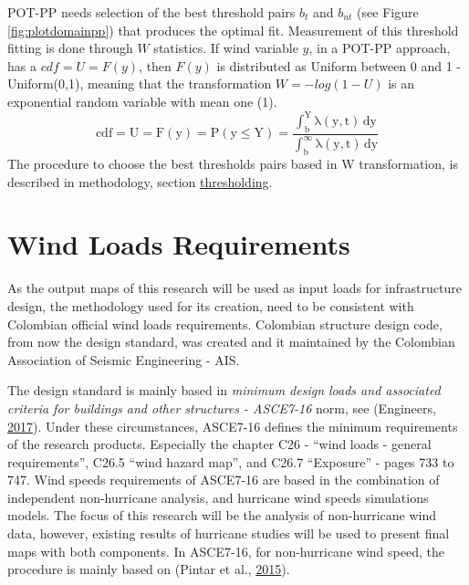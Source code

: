\documentclass[12pt,oneside]{reedthesis}
\begin{document}
POT-PP needs selection of the best threshold pairs \(b_t\) and \(b_{nt}\) (see Figure \ref{fig:plotdomainpp}) that produces the optimal fit. Measurement of this threshold fitting is done through \(W\) statistics. If wind variable \(y\), in a POT-PP approach, has a \(cdf = U = F(y)\), then \(F(y)\) is distributed as Uniform between 0 and 1 - Uniform(0,1), meaning that the transformation \(W = -log(1-U)\) is an exponential random variable with mean one (1).
\begin{equation}
  \mathrm{
            cdf = U= F(y) = P(y \leq Y) = \frac{\int_b^Y\lambda(y,t)\,dy}{\int_b^\infty\lambda(y,t)\,dy} 
         }
  \label{eq:ppcdf}
\end{equation}
The procedure to choose the best thresholds pairs based in W transformation, is described in methodology, section \protect\hyperlink{thresholding}{thresholding}.

\hypertarget{windloadsrequirements}{%
\section{Wind Loads Requirements}\label{windloadsrequirements}}

As the output maps of this research will be used as input loads for infrastructure design, the methodology used for its creation, need to be consistent with Colombian official wind loads requirements. Colombian structure design code, from now the design standard, was created and it maintained by the Colombian Association of Seismic Engineering - AIS.

The design standard is mainly based in \emph{minimum design loads and associated criteria for buildings and other structures - ASCE7-16} norm, see (Engineers, \protect\hyperlink{ref-Asce2017}{2017}). Under these circumstances, ASCE7-16 defines the minimum requirements of the research products. Especially the chapter C26 - ``wind loads - general requirements'', C26.5 ``wind hazard map'', and C26.7 ``Exposure'' - pages 733 to 747. Wind speeds requirements of ASCE7-16 are based in the combination of independent non-hurricane analysis, and hurricane wind speeds simulations models. The focus of this research will be the analysis of non-hurricane wind data, however, existing results of hurricane studies will be used to present final maps with both components. In ASCE7-16, for non-hurricane wind speed, the procedure is mainly based on (Pintar et al., \protect\hyperlink{ref-Pintar2015}{2015}).
\end{document}
